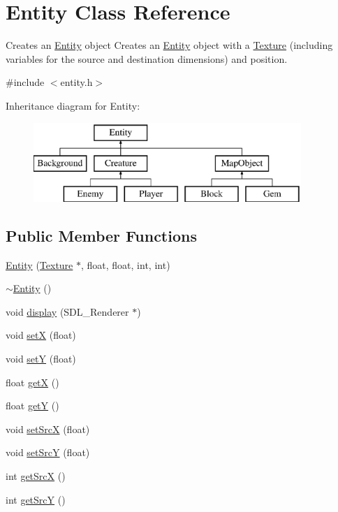 \hypertarget{class_entity}{\section{Entity Class Reference}
\label{class_entity}
}


Creates an \hyperlink{class_entity}{Entity} object Creates an \hyperlink{class_entity}{Entity} object with a \hyperlink{class_texture}{Texture} (including variables for the source and destination dimensions) and position.  




{\ttfamily \#include $<$entity.\+h$>$}

Inheritance diagram for Entity\+:\begin{figure}[H]
\begin{center}
\leavevmode
\includegraphics[height=3.000000cm]{class_entity}
\end{center}
\end{figure}
\subsection*{Public Member Functions}
\begin{DoxyCompactItemize}
\item 
\hyperlink{class_entity_a8a572d724b689de57d3c0d8bafeff107}{Entity} (\hyperlink{class_texture}{Texture} $\ast$, float, float, int, int)
\item 
\hyperlink{class_entity_adf6d3f7cb1b2ba029b6b048a395cc8ae}{$\sim$\+Entity} ()
\item 
void \hyperlink{class_entity_a2224871711ac97a54af338ddefc25ac9}{display} (S\+D\+L\+\_\+\+Renderer $\ast$)
\item 
void \hyperlink{class_entity_a38e2f110d39426ba4823296b4294dd74}{set\+X} (float)
\item 
void \hyperlink{class_entity_a8896110a266bdec69b14d34ec6374df8}{set\+Y} (float)
\item 
float \hyperlink{class_entity_abc5b6d26c039bf3bf6faa766990768b4}{get\+X} ()
\item 
float \hyperlink{class_entity_ab6dd7b404c13754202acfe3d2c65c77b}{get\+Y} ()
\item 
void \hyperlink{class_entity_ad59969bacea528293341a88a94f845be}{set\+Src\+X} (float)
\item 
void \hyperlink{class_entity_a1051f4e046b0de7f4c727e0e0edb3f6f}{set\+Src\+Y} (float)
\item 
int \hyperlink{class_entity_a0b7bd3804adb0a5c4b611bcbef6c12cc}{get\+Src\+X} ()
\item 
int \hyperlink{class_entity_aeaf17603c70755e07dfc32d6bd4e0d2e}{get\+Src\+Y} ()
\end{DoxyCompactItemize}
